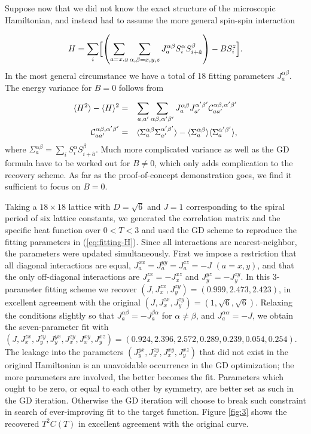 \documentclass[reprint,amsmath,amssymb,aps,showpacs,superscriptaddress,prb]{revtex4-1}
\newcommand{\ba}{\begin{eqnarray}}
\newcommand{\ea}{\end{eqnarray}}
\newcommand{\nn}{\nonumber \\}
\begin{document}
Suppose now that we did not know the exact structure of the microscopic Hamiltonian, and instead had to assume the more general spin-spin interaction

\ba H = \sum_{i} \Bigl[  \left( \sum_{a=x,y} \sum_{\alpha,\beta=x,y,z } J_a^{\alpha\beta} S_i^\alpha S_{i+\hat{a}}^\beta \right)  - B S_i^z  \Bigr] . \label{eq:fitting-H} \ea
In the most general circumstance we have a total of 18 fitting parameters $J_a^{\alpha\beta}$. The energy variance for $B=0$ follows from

\ba \langle H^2 \rangle - \langle H \rangle^2 & = & \sum_{a,a'} \sum_{\alpha\beta, \alpha'\beta'} J^{\alpha\beta}_a J^{\alpha'\beta'}_{a'}  {\cal C}_{aa'}^{\alpha\beta, \alpha' \beta'} \nn
%
{\cal C}_{aa'}^{\alpha\beta, \alpha' \beta'}  & = & \langle \Sigma_a^{\alpha\beta} \Sigma_{a'}^{\alpha' \beta'} \rangle - \langle \Sigma_a^{\alpha\beta}  \rangle \langle \Sigma_a^{\alpha' \beta' } \rangle , \ea
where $\Sigma_a^{\alpha\beta} = \sum_i S_i^\alpha S_{i+\hat{a}}^\beta$. Much more complicated variance as well as the GD formula have to be worked out for $B \neq 0$, which only adds complication to the recovery scheme. As far as the proof-of-concept demonstration goes, we find it sufficient to focus on $B=0$.

Taking a $18\times18$ lattice with $D=\sqrt{6}$ and $J=1$ corresponding to the spiral period of six lattice constants, we generated the correlation matrix and the specific heat function over $0<T < 3$ and used the GD scheme to reproduce the fitting parameters in (\ref{eq:fitting-H}). Since all interactions are nearest-neighbor, the parameters were updated simultaneously. First we impose a restriction that all diagonal interactions are equal, $J_a^{xx} = J_a^{yy} = J_a^{zz} = -J$ $(a=x,y)$, and that the only off-diagonal interactions are $J_{x}^{zx} = -J_x^{xz}$ and $J_{y}^{yz} = -J_y^{zy}$. In this 3-parameter fitting scheme we recover $(J, J_x^{zx}, J_y^{zy} ) = (0.999, 2.473, 2.423)$, in excellent agreement with the original $(J, J_x^{zx}, J_y^{zy} ) =(1,\sqrt{6},\sqrt{6})$. Relaxing the conditions slightly so that $J_a^{\alpha\beta}=-J_a^{\beta\alpha}$ for $\alpha\neq \beta$, and $J_a^{\alpha\alpha}=-J$, we obtain the seven-parameter fit with $(J, J_x^{zx}, J_y^{zy}, J^{yx}_y , J^{zy}_x, J^{xy}_x , J^{xz}_y ) = (0.924, 2.396, 2.572, 0.289, 0.239, 0.054, 0.254)$. The leakage into the parameters $(J^{yx}_y , J^{zy}_x, J^{xy}_x , J^{xz}_y )$ that did not exist in the original Hamiltonian is an unavoidable occurrence in the GD optimization; the more parameters are involved, the better becomes the fit. Parameters which ought to be zero, or equal to each other by symmetry, are better set as such in the GD iteration. Otherwise the GD iteration will choose to break such constraint in search of ever-improving fit to the target function. Figure \ref{fig:3} shows the recovered $T^2 C(T)$ in excellent agreement with the original curve.
\end{document}
